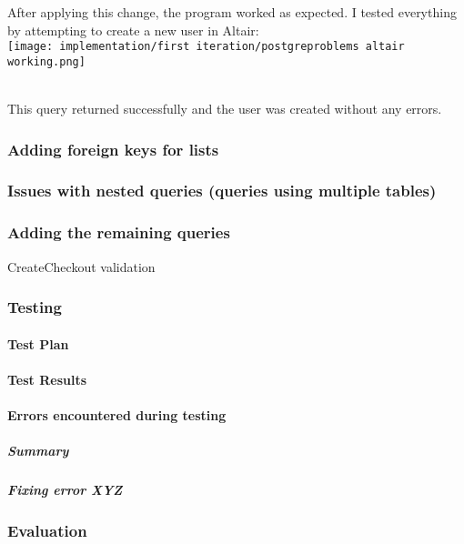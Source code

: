 \documentclass[../../main.tex]{subfiles}
\begin{document}
\noindent After applying this change, the program worked as expected. I tested everything by attempting to create a new user in Altair:\\

\texttt{[image: implementation/first iteration/postgreproblems altair working.png]}

\noindent \\ This query returned successfully and the user was created without any errors.

\subsubsection{Adding foreign keys for lists}

\subsubsection{Issues with nested queries (queries using multiple tables)}

\subsubsection{Adding the remaining queries}

CreateCheckout validation

\subsubsection{Testing}

\paragraph{Test Plan}

\paragraph{Test Results}

\paragraph{Errors encountered during testing}

\subparagraph{Summary}

\subparagraph{Fixing error XYZ}

\subsubsection{Evaluation}
\end{document}
